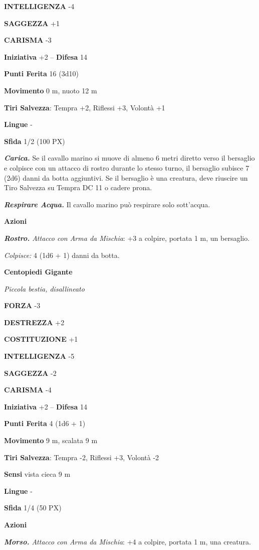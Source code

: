 \begin{multicols}{2}
\textbf{INTELLIGENZA} -4

\textbf{SAGGEZZA} +1

\textbf{CARISMA} -3

\textbf{Iniziativa} +2 -- \textbf{Difesa} 14

\textbf{Punti Ferita} 16 (3d10)

\textbf{Movimento} 0 m, nuoto 12 m

\textbf{Tiri Salvezza}: Tempra +2, Riflessi +3, Volontà +1

\textbf{Lingue} -

\textbf{Sfida} 1/2 (100 PX)

\textit{\textbf{Carica.}} Se il cavallo marino si muove di almeno 6 metri diretto verso il bersaglio e colpisce con un attacco di rostro durante lo stesso turno, il bersaglio subisce 7 (2d6) danni da botta aggiuntivi. Se il bersaglio è una creatura, deve riuscire un Tiro Salvezza su Tempra DC 11 o cadere prona.

\textit{\textbf{Respirare Acqua.}} Il cavallo marino può respirare solo sott'acqua.

\textbf{Azioni}

\textit{\textbf{Rostro.} Attacco con Arma da Mischia}: +3 a colpire, portata 1 m, un bersaglio.

\textit{Colpisce:} 4 (1d6 + 1) danni da botta.

\medskip\textbf{Centopiedi Gigante}

\textit{Piccola bestia, disallineato}

\textbf{FORZA} -3

\textbf{DESTREZZA} +2

\textbf{COSTITUZIONE} +1

\textbf{INTELLIGENZA} -5

\textbf{SAGGEZZA} -2

\textbf{CARISMA} -4

\textbf{Iniziativa} +2 -- \textbf{Difesa} 14

\textbf{Punti Ferita} 4 (1d6 + 1)

\textbf{Movimento} 9 m, scalata 9 m

\textbf{Tiri Salvezza}: Tempra -2, Riflessi +3, Volontà -2

\textbf{Sensi} vista cieca 9 m

\textbf{Lingue} -

\textbf{Sfida} 1/4 (50 PX)

\textbf{Azioni}

\textit{\textbf{Morso.} Attacco con Arma da Mischia}: +4 a colpire, portata 1 m, una creatura.


\end{multicols}
